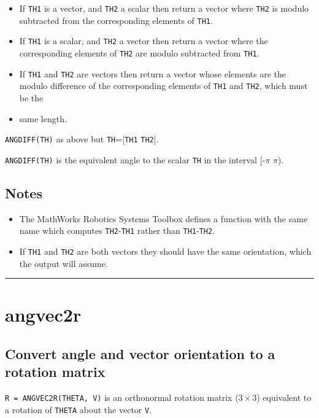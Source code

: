 \begin{itemize}
  \item If \texttt{TH1} is a vector, and \texttt{TH2} a scalar then return a vector where \texttt{TH2} is modulo    subtracted from the corresponding elements of \texttt{TH1}.
  \item If \texttt{TH1} is a scalar, and \texttt{TH2} a vector then return a vector where the    corresponding elements of \texttt{TH2} are modulo subtracted from \texttt{TH1}.
  \item If \texttt{TH1} and \texttt{TH2} are vectors then return a vector whose elements are the modulo    difference of the corresponding elements of \texttt{TH1} and \texttt{TH2}, which must be the
  \item same length.
\end{itemize}


\texttt{ANGDIFF(TH)} as above but \texttt{TH}=[\texttt{TH1} \texttt{TH2}].



\texttt{ANGDIFF(TH)} is the equivalent angle to the scalar \texttt{TH} in the interval [-$\pi$ $\pi$).


\subsection*{Notes}
\begin{itemize}
  \item The MathWorks Robotics Systems Toolbox defines a function with the same name    which computes \texttt{TH2}-\texttt{TH1} rather than \texttt{TH1}-\texttt{TH2}.
  \item If \texttt{TH1} and \texttt{TH2} are both vectors they should have the same    orientation, which the output will assume.
\end{itemize}
\vspace{1.5ex}\rule{\textwidth}{1mm}

\hypertarget{angvec2r}{\section*{angvec2r}}
\subsection*{Convert angle and vector orientation to a rotation matrix}


\texttt{R = ANGVEC2R(THETA, V)} is an orthonormal rotation matrix ($3 \times 3$)
equivalent to a rotation of \texttt{THETA} about the vector \texttt{V}.


